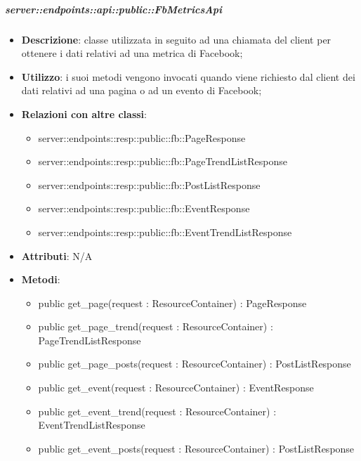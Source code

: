     \subparagraph{server::endpoints::api::public::FbMetricsApi} %
    \label{subp:bdsm_app_server_endpoints_api_public_fbmetricsapi}
    \begin{itemize}
      \item \textbf{Descrizione}: classe utilizzata in seguito ad una chiamata del client per ottenere i dati relativi ad una metrica di Facebook;
      \item \textbf{Utilizzo}: i suoi metodi vengono invocati quando viene richiesto dal client dei dati relativi ad una pagina o ad un evento di Facebook;
      \item \textbf{Relazioni con altre classi}:
        \begin{itemize}
          \item server::endpoints::resp::public::fb::PageResponse
          \item server::endpoints::resp::public::fb::PageTrendListResponse
          \item server::endpoints::resp::public::fb::PostListResponse
          \item server::endpoints::resp::public::fb::EventResponse
          \item server::endpoints::resp::public::fb::EventTrendListResponse
        \end{itemize}
		\item \textbf{Attributi}: N/A
		\item \textbf{Metodi}:   
			\begin{itemize}
				\item public get\_page(request : ResourceContainer) : PageResponse
				\item public get\_page\_trend(request : ResourceContainer) : PageTrendListResponse
				\item public get\_page\_posts(request : ResourceContainer) : PostListResponse
				\item public get\_event(request : ResourceContainer) : EventResponse
				\item public get\_event\_trend(request : ResourceContainer) : EventTrendListResponse
				\item public get\_event\_posts(request : ResourceContainer) : PostListResponse
			\end{itemize}
      \end{itemize}

